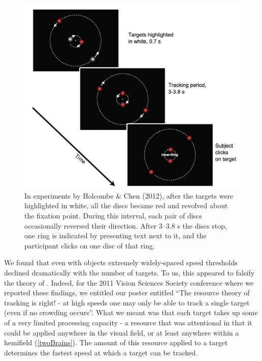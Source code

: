 \documentclass[
]{book}
\begin{document}
\begin{figure}
\includegraphics[width=1\linewidth]{imagesForRmd/HolcombeChen2012BasicTrial} \caption{In experiments by Holcombe & Chen (2012), after the targets were highlighted in white, all the discs became red and revolved about the fixation point. During this interval, each pair of discs occasionally reversed their direction. After 3–3.8 s the discs stop, one ring is indicated by presenting text next to it, and the participant clicks on one disc of that ring.}\label{fig:HC2012BasicTrial}
\end{figure}

We found that even with objects extremely widely-spaced speed thresholds declined dramatically with the number of targets. To us, this appeared to falsify the theory of \citet{franconeriTrackingMultipleObjects2010a}. Indeed, for the 2011 Vision Sciences Society conference where we reported these findings, we entitled our poster entitled ``The resource theory of tracking is right! - at high speeds one may only be able to track a single target (even if no crowding occurs''. What we meant was that each target takes up some of a very limited processing capacity - a resource that was attentional in that it could be applied anywhere in the visual field, or at least anywhere within a hemifield (\ref{twoBrains}). The amount of this resource applied to a target determines the fastest speed at which a target can be tracked.
\end{document}
